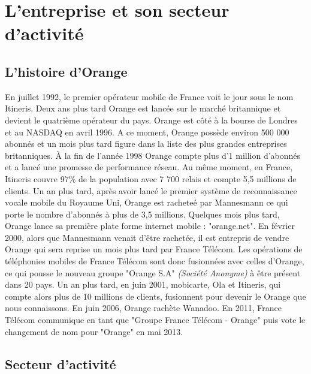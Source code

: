 \chapter{L'entreprise et son secteur d'activité}
\label{chap:premierchapitre}

\section{L'histoire d'Orange}


En juillet 1992, le premier opérateur mobile  de France voit le jour sous le nom Itineris. Deux ans plus tard Orange est lancée sur le marché britannique et devient le quatrième opérateur du pays. Orange est côté à la bourse de Londres et au NASDAQ en avril 1996. A ce moment, Orange possède environ 500 000 abonnés et un mois plus tard figure dans la liste des plus grandes entreprises britanniques. À la fin de l'année 1998 Orange compte plus d'1 million d'abonnés et a lancé une promesse de performance réseau. Au même moment, en France, Itineris couvre 97\% de la population avec 7 700 relais et compte 5,5 millions de clients. Un an plus tard, après avoir lancé le premier système de reconnaissance vocale mobile du Royaume Uni, Orange est racheteé par Mannesmann ce qui porte le nombre d'abonnés à plus de 3,5 millions. Quelques mois plus tard, Orange lance sa première plate forme internet mobile : "orange.net". En février 2000, alors que Mannesmann venait d'être rachetée, il est entrepris de vendre Orange qui sera reprise un mois plus tard par France Télécom. Les opérations de téléphonies mobiles de France Télécom sont donc fusionnées avec celles d'Orange, ce qui pousse le nouveau groupe "Orange S.A" \textit{(Société Anonyme)} à être présent dans 20 pays. Un an plus tard, en juin 2001, mobicarte, Ola et Itineris, qui compte alors plus de 10 millions de clients, fusionnent pour devenir le Orange que nous connaissons. En juin 2006, Orange rachète Wanadoo. En 2011, France Télécom communique en tant que "Groupe France Télécom - Orange" puis vote le changement de nom pour "Orange" en mai 2013.



\section{Secteur d'activité}

